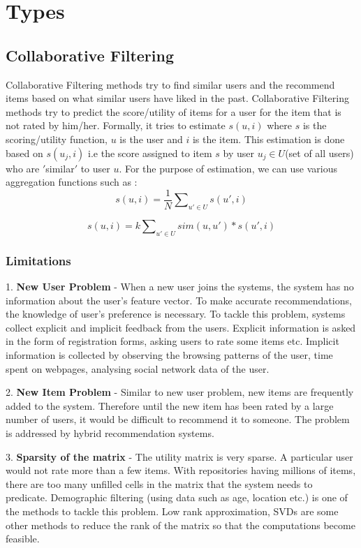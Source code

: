 \section{Types}
\subsection{Collaborative Filtering}
Collaborative Filtering methods try to find similar users and the recommend items based on what similar users have liked in the past. Collaborative Filtering methods try to predict the score/utility of items for a user for the item that is not rated by him/her. Formally, it tries to estimate $s(u,i)$ where $s$ is the scoring/utility function, $u$ is the user and $i$ is the item. This estimation is done based on $s(u_j,i)$ i.e the score assigned to item $s$ by user $u_j\in U$(set of all users) who are $'$similar$'$ to user $u$. For the purpose of estimation, we can use various aggregation functions such as : 
\begin{equation}
s(u,i) = \frac{1}{N}\sum\nolimits_{u' \in U} s(u',i) 
\end{equation}

\begin{equation}
s(u,i) = k\sum\nolimits_{u' \in U} sim(u,u') * s(u',i) 
\end{equation}

\subsubsection{Limitations}

1. {\bf New User Problem} - When a new user joins the systems, the system has no information about the user's feature vector. To make accurate recommendations, the knowledge of user's preference is necessary. To tackle this problem, systems collect explicit and implicit feedback from the users. Explicit information is asked in the form of registration forms, asking users to rate some items etc. Implicit information is collected by observing the browsing patterns of the user, time spent on webpages, analysing social network data of the user.

2. {\bf New Item Problem} - Similar to new user problem, new items are frequently added to the system. Therefore until the new item has been rated by a large number of users, it would be difficult to recommend it to someone. The problem is addressed by hybrid recommendation systems.

3. {\bf Sparsity of the matrix} - The utility matrix is very sparse. A particular user would not rate more than a few items. With repositories having millions of items, there are too many unfilled cells in the matrix that the system needs to predicate. Demographic filtering (using data such as age, location etc.) is one of the methods to tackle this problem. Low rank approximation, SVDs are some other methods to reduce the rank of the matrix so that the computations become feasible. 

